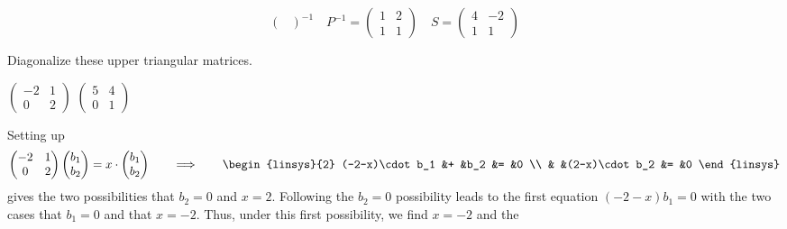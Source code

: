 \begin{exercises}
\begin{answer}
\begin{equation*}
\begin{pmatrix}
         \end{pmatrix}^{-1}
         \quad
         P^{-1}=
         \begin{pmatrix}
           1  &2  \\
           1  &1
         \end{pmatrix}
         \quad
         S=
         \begin{pmatrix}
           4  &-2  \\
           1  &1
         \end{pmatrix}
      \end{equation*}
    \end{answer}
  \item 
    Diagonalize these upper triangular matrices.
    \begin{exparts*}
      \partsitem 
        $\begin{pmatrix}
          -2  &1  \\
           0  &2
        \end{pmatrix}$
      \partsitem 
        $\begin{pmatrix}
          5  &4  \\
          0  &1
        \end{pmatrix}$
    \end{exparts*}
    \begin{answer}
      \begin{exparts}
        \partsitem
          Setting up
          \begin{equation*}
            \begin{pmatrix}
              -2  &1  \\
               0  &2
            \end{pmatrix}
            \colvec{b_1 \\ b_2}
            =x\cdot\colvec{b_1 \\ b_2}
            \qquad\Longrightarrow\qquad 
            \begin{linsys}{2}
               (-2-x)\cdot b_1  &+  &b_2            &=  &0  \\
                                &   &(2-x)\cdot b_2 &= &0
            \end{linsys}
          \end{equation*}
          gives the two possibilities that $b_2=0$ and $x=2$.
          Following the $b_2=0$ possibility leads to the first equation
          $(-2-x)b_1=0$ with the two cases that $b_1=0$ and that
          $x=-2$.
          Thus, under this first possibility, we find $x=-2$ and the 

\end{exparts}
\end{answer}
\end{exercises}
